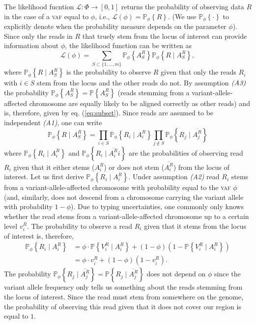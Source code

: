 \documentclass[a4paper,12pt]{article}
\newcommand{\p}[1]{\mathds{P}\left\{#1 \right\}}
\newcommand{\pp}[1]{\mathds{P}_{\phi} \left\{#1 \right\}}
\begin{document}
The likelihood fucntion $\mathcal{L} : \Phi \rightarrow [0,1]$ returns the probability of observing data $R$ in the case of a \textsc{vaf} equal to $\phi$, i.e., 
$\mathcal{L}(\phi) = \pp{R}$. (We use $\pp{\cdot}$ to explicitly denote when the probability measure depends on the parameter $\phi$). 
Since only the reads in $R$ that truely stem from the locus of interest can provide information about $\phi$, the likelihood function can be written as
\begin{equation}
  \mathcal{L}(\phi) = \sum_{S \subset \{1,\dots,m\}} \pp{A_S^R} \pp{R \mid A_S^R},
\end{equation}
where $\pp{R \mid A_S^R}$ is the probability to observe $R$ given that only the reads $R_i$ with $i \in S$ stem from the locus and the other reads do not. By assumption $\emph{(A3)}$ the probability $\pp{A_S^R} = \p{A_S^R}$ (reads stemming from a variant-allele-affected chromosome are equally likely to be aligned correctly as other reads) and is, therefore, given by eq. (\ref{eq:subset}). 
Since reads are assumed to be independent \emph{(A1)}, one can write 
\begin{equation}
 \pp{R \mid A_S^R} = \prod_{i \in S} \pp{R_i \mid A_i^R} \prod_{j \not \in S} \pp{R_j \mid \overline{A_j^R}}
\end{equation}
where $\pp{R_i \mid A_i^R}$ and $\pp{R_i \mid \overline{A_i^R}i}$ are the probabilities of observing read $R_i$ given that it either stems ($A_i^R$) or does not stem ($\overline{A_i^R}$) from the locus of interest. Let us first derive $\pp{R_i \mid A_i^R}$. Under assumption \emph{(A2)} read $R_i$ stems from a variant-allele-affected chromosome with probability equal to the \textsc{vaf} $\phi$ (and, similarly, does not descend from a chromosome carrying the variant allele with probability $1 - \phi$). Due to typing uncertainties, one commonly only knows whether the read stems from a variant-allele-affected chromosome up to a certain level $v_i^R$. The probability to observe a read $R_i$ given that it stems from the locus of interest is, therefore,
\begin{equation}
  \begin{aligned}
 \pp{R_i \mid A_i^R} & = \phi \cdot \p{V_i^R \mid A_i^R} + (1 - \phi)\left(1 - \p{V_i^R \mid A_i^R} \right) \\ & = \phi \cdot v_i^R + (1 - \phi)\left(1 - v_i^R \right). 
  \end{aligned}
  \label{eq:f}
\end{equation}
The probability $\pp{R_j \mid \overline{A_j^R}} = \p{R_j \mid \overline{A_j^R}}$ does not depend on $\phi$ since the variant allele frequency only tells us something about the reads stemming from the locus of interest. Since the read must stem from somewhere on the genome, the probability of observing this read given that it does not cover our region is equal to $1$.  
\end{document}
